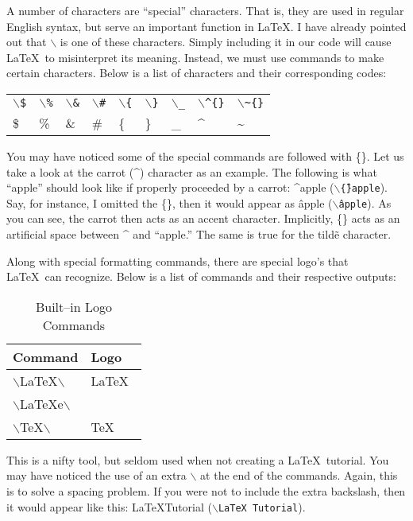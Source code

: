 \documentclass{article}
\begin{document}
A number of characters are ``special'' characters. That is, they are used in regular English syntax, but serve an important function in \LaTeX. I have already pointed out that $\backslash$ is one of these characters. Simply including it in our code will cause \LaTeX\ to misinterpret its meaning. Instead, we must use commands to make certain characters. Below is a list of characters and their corresponding codes:
\begin{tabular}{l l l l l l l l l}
				\texttt{$\backslash$\$} & \texttt{$\backslash$\%} & \texttt{$\backslash$\&} & \texttt{$\backslash$\#} & \texttt{$\backslash$\{} & \texttt{$\backslash$\}} & \texttt{$\backslash$\_} & \texttt{$\backslash$\^{}\{\}} & \texttt{$\backslash$\~{}\{\}} \\
				\$ & \% & \& & \# & \{ & \} & \_ & \^{} & \~{} \\
\end{tabular}
You may have noticed some of the special commands are followed with \{\}. Let us take a look at the carrot (\^{}) character as an example. The following is what ``apple'' should look like if properly proceeded by a carrot: \^{}apple (\texttt{$\backslash$\^\{\}apple}). Say, for instance, I omitted the \{\}, then it would appear as \^apple (\texttt{$\backslash$\^apple}). As you can see, the carrot then acts as an accent character. Implicitly, \{\} acts as an artificial space between \^{} and ``apple.'' The same is true for the tild\~e character.

Along with special formatting commands, there are special logo's that \LaTeX\ can recognize. Below is a list of commands and their respective outputs:
		\begin{table}\caption{Built--in Logo Commands}\label{tbl:logo}	
			\begin{center}
				\begin{tabular}{|l|l|}
					\hline
					Command & Logo \\
					\hline
					$\backslash$LaTeX$\backslash$ & \LaTeX\ \\
					\hline
					$\backslash$LaTeXe$\backslash$ & \LaTeXe\ \\
					\hline
					$\backslash$TeX$\backslash$ & \TeX\ \\
					\hline
				\end{tabular}
			\end{center}
		\end{table}
This is a nifty tool, but seldom used when not creating a \LaTeX\ tutorial. You may have noticed the use of an extra $\backslash$ at the end of the commands. Again, this is to solve a spacing problem. If you were not to include the extra backslash, then it would appear like this: \LaTeX Tutorial (\texttt{$\backslash$LaTeX Tutorial}).
\end{document}
